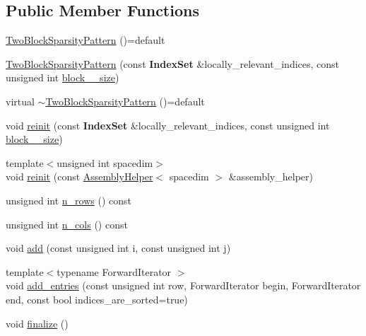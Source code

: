 \subsection*{Public Member Functions}
\begin{DoxyCompactItemize}
\item 
\hyperlink{class_two_block_sparsity_pattern_a5bcc54c1c6b0d769807644f1c87fa136}{Two\+Block\+Sparsity\+Pattern} ()=default
\item 
\hyperlink{class_two_block_sparsity_pattern_ab7240dc72bf5fdb32fc192f70e6c68b0}{Two\+Block\+Sparsity\+Pattern} (const {\bf Index\+Set} \&locally\+\_\+relevant\+\_\+indices, const unsigned int \hyperlink{class_two_block_sparsity_pattern_a81789900ac1a9f5bfd7f85ad730eb03b}{block\+\_\+\_\+size})
\item 
virtual \hyperlink{class_two_block_sparsity_pattern_abe3cbf4d3ee10b66234c5f8b566a938f}{$\sim$\+Two\+Block\+Sparsity\+Pattern} ()=default
\item 
void \hyperlink{class_two_block_sparsity_pattern_ae18398b187a0dba1570abfec1a4e082d}{reinit} (const {\bf Index\+Set} \&locally\+\_\+relevant\+\_\+indices, const unsigned int \hyperlink{class_two_block_sparsity_pattern_a81789900ac1a9f5bfd7f85ad730eb03b}{block\+\_\+\_\+size})
\item 
{\footnotesize template$<$unsigned int spacedim$>$ }\\void \hyperlink{class_two_block_sparsity_pattern_a8c9a56a20123e8eaea65f9eb6efed250}{reinit} (const \hyperlink{class_assembly_helper}{Assembly\+Helper}$<$ spacedim $>$ \&assembly\+\_\+helper)
\item 
unsigned int \hyperlink{class_two_block_sparsity_pattern_a1f95d380bc078a6abf6ef67fcb076e0d}{n\+\_\+rows} () const 
\item 
unsigned int \hyperlink{class_two_block_sparsity_pattern_a33a0e1a01a788c73b474426128b18179}{n\+\_\+cols} () const 
\item 
void \hyperlink{class_two_block_sparsity_pattern_ab3787657efc568999fbf24cb5208d46b}{add} (const unsigned int i, const unsigned int j)
\item 
{\footnotesize template$<$typename Forward\+Iterator $>$ }\\void \hyperlink{class_two_block_sparsity_pattern_a97c69542e0e22e5653c8b4f7b4275635}{add\+\_\+entries} (const unsigned int row, Forward\+Iterator begin, Forward\+Iterator end, const bool indices\+\_\+are\+\_\+sorted=true)
\item 
void \hyperlink{class_two_block_sparsity_pattern_a051b557d53ca8367228b7829c55d4af5}{finalize} ()

\end{DoxyCompactItemize}
